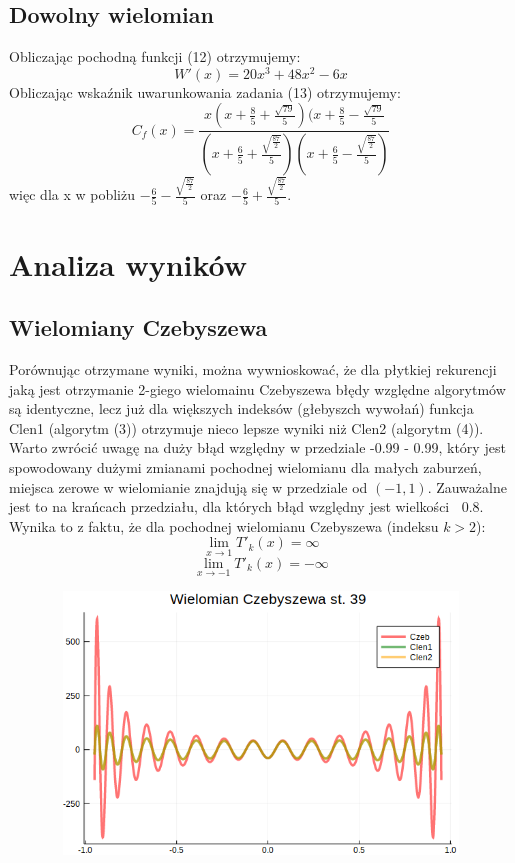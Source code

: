 \documentclass{article}
\begin{document}
\subsection{Dowolny wielomian}
Obliczając pochodną funkcji (12) otrzymujemy:
\begin{equation}
    W'(x) = 20x^3 + 48x^2 -6x
\end{equation}
Obliczając wskaźnik uwarunkowania zadania (13) otrzymujemy:
\begin{equation}
    C_{f}(x) =  \frac{x(x + \frac{8}{5} + \frac{\sqrt{79}}{5})(x + \frac{8}{5} - \frac{\sqrt{79}}{5}}{(x + \frac{6}{5} + \frac{\sqrt{\frac{87}{2}}}{5})(x + \frac{6}{5} - \frac{\sqrt{\frac{87}{2}}}{5})}
\end{equation}
więc dla x w pobliżu $-\frac{6}{5} - \frac{\sqrt{\frac{87}{2}}}{5}$ oraz $-\frac{6}{5} + \frac{\sqrt{\frac{87}{2}}}{5}$.
\section{Analiza wyników}
\subsection{Wielomiany Czebyszewa}
\indent Porównując otrzymane wyniki, można wywnioskować, że dla płytkiej rekurencji jaką jest otrzymanie 2-giego wielomainu Czebyszewa błędy względne algorytmów są identyczne, lecz już dla większych indeksów (głebyszch wywołań) funkcja Clen1 (algorytm (3)) otrzymuje nieco lepsze wyniki niż Clen2 (algorytm (4)).\\
\indent Warto zwrócić uwagę na duży błąd względny w przedziale -0.99 - 0.99, który jest spowodowany dużymi zmianami pochodnej wielomianu dla małych zaburzeń, miejsca zerowe w wielomianie znajdują się w przedziale od $(-1,1)$. Zauważalne jest to na krańcach przedziału, dla których błąd względny jest wielkości $~$ 0.8. Wynika to z faktu, że dla pochodnej wielomianu Czebyszewa (indeksu $k > 2$):
$$\lim_{x \to 1} T'_k(x) = \infty$$
$$\lim_{x \to -1} T'_k(x) = -\infty$$
\begin{figure}[h]
\centering
\includegraphics[width=12cm,height=7cm]{wykresczeb.png}
\end{figure}
\end{document}
